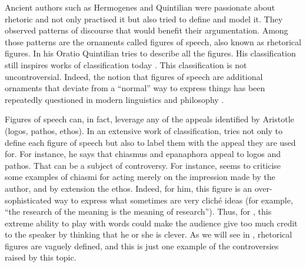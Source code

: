 Ancient authors such as Hermogenes and Quintilian \citep{Butler1921} were passionate about rhetoric and not only practised it but also tried to define and model it. They observed patterns of discourse that would benefit their argumentation. Among those patterns are the ornaments called figures of speech, also known as rhetorical figures. In his Oratio  \citep{Butler1921} Quintilian tries to describe all the figures. His classification still inspires works of classification today \citep{harris2009,Burton1996}. This classification is not uncontroversial.  Indeed, the notion that figures of speech are additional ornaments that deviate from a ``normal'' way to express things has been repeatedly questioned in modern linguistics and philosophy \citep{Jakobson1956,Derrida1982}.%
 
 Figures of speech can, in fact, leverage any of the appeals identified by Aristotle (logos, pathos, ethos). In an extensive work of classification, \cite{Howard2010} tries not only to define each figure of speech but also to label them with the appeal they are used for. For instance, he says that chiasmus and epanaphora appeal to logos and pathos. That can be a subject of controversy. For instance, \citet{Vandendorpe1991} seems to criticise some examples of chiasmi for acting merely on the impression made by the author, and by extension the ethos. Indeed, for him, this figure is an over-sophisticated way to express what sometimes are very cliché ideas (for example, ``the research of the meaning is the meaning of research''). Thus, for \citet{Vandendorpe1991}, this extreme ability to play with words could make the audience give too much credit to the speaker by thinking that he or she is clever. As we will see in , rhetorical figures are vaguely defined, and this is just one example of the controversies raised by this topic.

